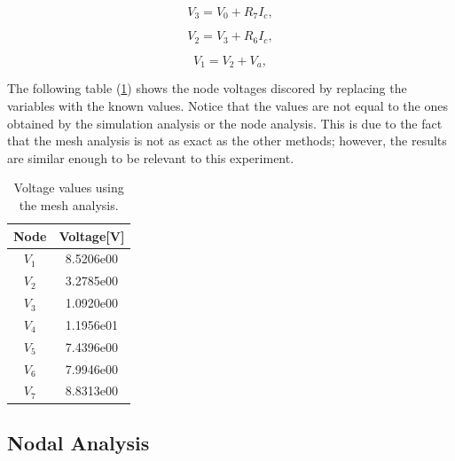 \begin{equation}
  V_{3} = V_{0} + R_{7}I_{c},
  \label{eq:node3}
\end{equation}

\begin{equation}
  V_{2} = V_{3} + R_{6}I_{c},
  \label{eq:node2}
\end{equation}

\begin{equation}
  V_{1} = V_{2} + V_{a},
  \label{eq:node1}
\end{equation}

The following table (\ref{table:nodesmesh}) shows the node voltages discored by replacing the variables with the known values. Notice that the values are not equal to the ones obtained by the simulation analysis or the node analysis. This is due to the fact that the mesh analysis is not as exact as the other methods; however, the results are similar enough to be relevant to this experiment.
\begin{table}[h!]
\centering
\begin{tabular}{ |c|c| } 
 \hline
 {\bf Node} & {\bf Voltage[V]} \\ 
 \hline\hline
 $V_1$ & 8.5206e00 \\ 
 \hline
 $V_2$ & 3.2785e00 \\ 
 \hline
 $V_3$ & 1.0920e00 \\ 
 \hline
 $V_4$ & 1.1956e01 \\ 
 \hline
 $V_5$ & 7.4396e00 \\ 
 \hline
 $V_6$ & 7.9946e00 \\ 
 \hline
 $V_7$ & 8.8313e00 \\ 
 \hline
\end{tabular}
\caption{Voltage values using the mesh analysis.}
\label{table:nodesmesh}
\end{table}

\subsection{Nodal Analysis}
